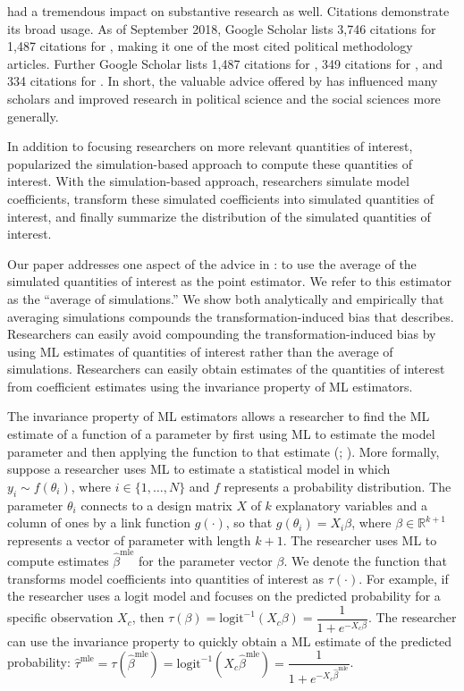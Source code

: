 \documentclass[11pt]{article}
\begin{document}
\cite{KingTomzWittenberg2000} had a tremendous impact on substantive research as well. Citations demonstrate its broad usage. As of September 2018, Google Scholar lists 3,746 citations for \cite{KingTomzWittenberg2000} 1,487 citations for \cite{TomzWittenbergKing2003}, making it one of the most cited political methodology articles. Further Google Scholar lists 1,487 citations for \cite{TomzWittenbergKing2003}, 349 citations for \cite{ImaiKingLau2008}, and 334 citations for \cite{Choiratetal}. In short, the valuable advice offered by \cite{KingTomzWittenberg2000} has influenced many scholars and improved research in political science and the social sciences more generally.

In addition to focusing researchers on more relevant quantities of interest, \cite{KingTomzWittenberg2000} popularized the simulation-based approach to compute these quantities of interest. With the simulation-based approach, researchers simulate model coefficients, transform these simulated coefficients into simulated quantities of interest, and finally summarize the distribution of the simulated quantities of interest.

Our paper addresses one aspect of the advice in \cite{KingTomzWittenberg2000}: to use the average of the simulated quantities of interest as the point estimator. We refer to this estimator as the ``average of simulations.'' We show both analytically and empirically that averaging simulations compounds the transformation-induced bias that \cite{Rainey2017} describes. Researchers can easily avoid compounding the transformation-induced bias by using ML estimates of quantities of interest rather than the average of simulations. Researchers can easily obtain estimates of the quantities of interest from coefficient estimates using the invariance property of ML estimators.

The invariance property of ML estimators allows a researcher to find the ML estimate of a function of a parameter by first using ML to estimate the model parameter and then applying the function to that estimate (\citealt[pp.\@ 75--76]{King1989}; \citealt[pp.\@ 320--321]{CasellaBerger2002}). More formally, suppose a researcher uses ML to estimate a statistical model in which $y_i \sim f(\theta_i)$, where $i \in \{1,\ldots, N\}$ and $f$ represents a probability distribution. The parameter $\theta_i$ connects to a design matrix $X$ of $k$ explanatory variables and a column of ones by a link function $g(\cdot)$, so that $g(\theta_i) = X_i\beta$, where $\beta \in \mathbb{R}^{k+1}$ represents a vector of parameter with length $k + 1$. The researcher uses ML to compute estimates $\hat{\beta}^{\text{mle}}$ for the parameter vector $\beta$. We denote the function that transforms model coefficients into quantities of interest as $\tau(\cdot)$. For example, if the researcher uses a logit model and focuses on the predicted probability for a specific observation $X_c$, then $\tau(\beta) = \text{logit}^{-1}( X_c \beta) = \dfrac{1}{1 + e^{-X_c\beta}}$. The researcher can use the invariance property to quickly obtain a ML estimate of the predicted probability: $\hat{\tau}^{\text{mle}} = \tau \left( \hat{\beta}^{\text{mle}}\right) = \text{logit}^{-1} \left( X_c \hat{\beta}^{\text{mle}} \right) = \dfrac{1}{1 + e^{-X_c \hat{\beta}^{\text{mle}}}}$.
\end{document}
